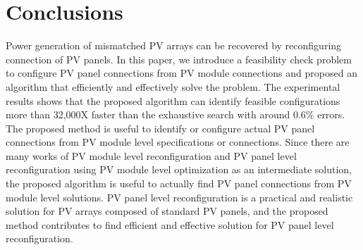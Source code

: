 \documentclass[conference]{IEEEtran}
\begin{document}
\section{Conclusions}\label{Sec7}
Power generation of mismatched PV arrays can be recovered by reconfiguring connection of PV panels.
In this paper, we introduce a feasibility check problem to configure PV panel connections from PV module connections and proposed an algorithm that efficiently and effectively solve the problem. The experimental results shows that the proposed algorithm can identify feasible configurations more than 32,000X faster than the exhaustive search with around 0.6\% errors. 
The proposed method is useful to identify or configure actual PV panel connections from PV module level specifications or connections. 
Since there are many works of PV module level reconfiguration and PV panel level reconfiguration using PV module level optimization as an intermediate solution, the proposed algorithm is useful to actually find PV panel connections from PV module level solutions.
PV panel level reconfiguration is a practical and realistic solution for PV arrays composed of standard PV panels, 
and the proposed method contributes to find efficient and effective solution for PV panel level reconfiguration.




\renewcommand\refname{Reference}


\end{document}
